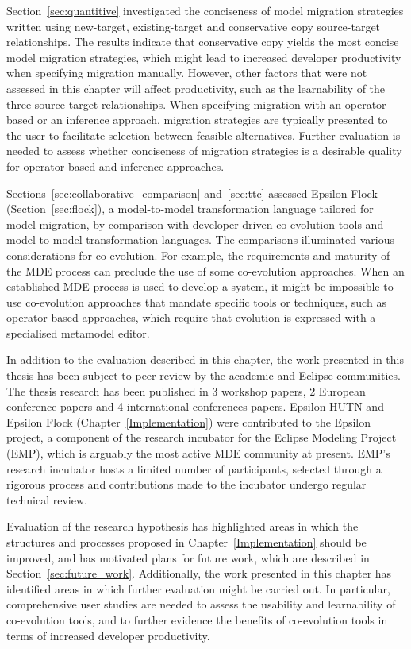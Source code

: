 Section~\ref{sec:quantitive} investigated the conciseness of model migration strategies written using new-target, existing-target and conservative copy source-target relationships. The results indicate that conservative copy yields the most concise model migration strategies, which might lead to increased developer productivity when specifying migration manually. However, other factors that were not assessed in this chapter will affect productivity, such as the learnability of the three source-target relationships. When specifying migration with an operator-based or an inference approach, migration strategies are typically presented to the user to facilitate selection between feasible alternatives. Further evaluation is needed to assess whether conciseness of migration strategies is a desirable quality for operator-based and inference approaches.
 
Sections~\ref{sec:collaborative_comparison} and~\ref{sec:ttc} assessed Epsilon Flock (Section~\ref{sec:flock}), a model-to-model transformation language tailored for model migration, by comparison with developer-driven co-evolution tools and model-to-model transformation languages. The comparisons illuminated various considerations for co-evolution. For example, the requirements and maturity of the MDE process can preclude the use of some co-evolution approaches. When an established MDE process is used to develop a system, it might be impossible to use co-evolution approaches that mandate specific tools or techniques, such as operator-based approaches, which require that evolution is expressed with a specialised metamodel editor.

In addition to the evaluation described in this chapter, the work presented in this thesis has been subject to peer review by the academic and Eclipse communities. The thesis research has been published in 3 workshop papers, 2 European conference papers and 4 international conferences papers. Epsilon HUTN and Epsilon Flock (Chapter~\ref{Implementation}) were contributed to the Epsilon project, a component of the research incubator for the Eclipse Modeling Project (EMP), which is arguably the most active MDE community at present. EMP's research incubator hosts a limited number of participants, selected through a rigorous process and contributions made to the incubator undergo regular technical review. 

Evaluation of the research hypothesis has highlighted areas in which the structures and processes proposed in Chapter~\ref{Implementation} should be improved, and has motivated plans for future work, which are described in Section~\ref{sec:future_work}. Additionally, the work presented in this chapter has identified areas in which further evaluation might be carried out. In particular, comprehensive user studies are needed to assess the usability and learnability of co-evolution tools, and to further evidence the benefits of co-evolution tools in terms of increased developer productivity.